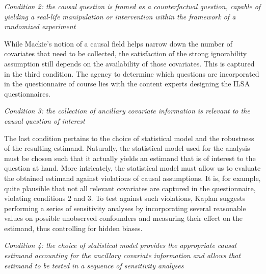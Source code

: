 \textit{Condition 2: the causal question is framed as a counterfactual question, capable of yielding a real-life manipulation or intervention within the framework of a randomized experiment} \newline

While Mackie's notion of a causal field helps narrow down the number of covariates that need to be collected, the satisfaction of the strong ignorability assumption still depends on the availability of those covariates. This is captured in the third condition. The agency to determine which questions are incorporated in the questionnaire of course lies with the content experts designing the ILSA questionnaires. \newline

\textit{Condition 3: the collection of ancillary covariate information is relevant to the causal question of interest} \newline

The last condition pertains to the choice of statistical model and the robustness of the resulting estimand. Naturally, the statistical model used for the analysis must be chosen such that it actually yields an estimand that is of interest to the question at hand. More intricately, the statistical model must allow us to evaluate the obtained estimand against violations of causal assumptions. It is, for example, quite plausible that not all relevant covariates are captured in the questionnaire, violating conditions 2 and 3. To test against such violations, Kaplan suggests performing a series of sensitivity analyses by incorporating several reasonable values on possible unobserved confounders and measuring their effect on the estimand, thus controlling for hidden biases. \newline

\textit{Condition 4: the choice of statistical model provides the appropriate causal estimand accounting for the ancillary covariate information and allows that estimand to be tested in a sequence of sensitivity analyses} \newline
